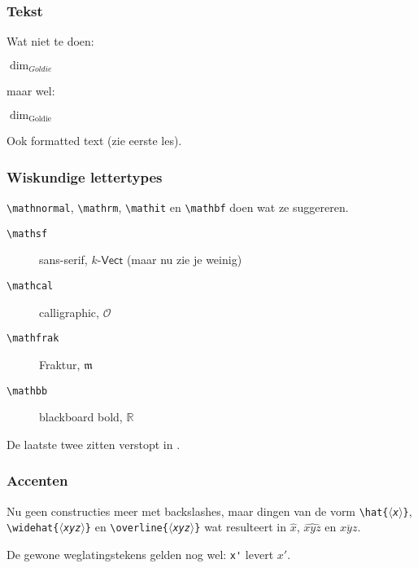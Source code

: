 \begin{frame}[fragile]
  \frametitle{Tekst}

  Wat niet te doen:
  \begin{LTXexample}
$\dim_{Goldie}$
  \end{LTXexample}
  maar wel:
  \begin{LTXexample}
$\dim_{\text{Goldie}}$
  \end{LTXexample}

  Ook formatted text (zie eerste les).
\end{frame}

\begin{frame}[fragile]
  \frametitle{Wiskundige lettertypes}

  \texttt{\textbackslash mathnormal}, \texttt{\textbackslash mathrm}, \texttt{\textbackslash mathit} en \texttt{\textbackslash mathbf} doen wat ze suggereren.

  \begin{description}
    \item[\texttt{\textbackslash mathsf}] sans-serif, $\text{$k$-}\mathsf{Vect}$ (maar nu zie je weinig)
    \item[\texttt{\textbackslash mathcal}] calligraphic, $\mathcal{O}$
    \item[\texttt{\textbackslash mathfrak}] Fraktur, $\mathfrak{m}$
    \item[\texttt{\textbackslash mathbb}] blackboard bold, $\mathbb{R}$
  \end{description}

  De laatste twee zitten verstopt in .
\end{frame}

\begin{frame}[fragile]
  \frametitle{Accenten}

  Nu geen constructies meer met backslashes, maar dingen van de vorm \texttt{\textbackslash hat\{\textsl{$\langle$x$\rangle$}\}}, \texttt{\textbackslash widehat\{\textsl{$\langle$xyz$\rangle$}\}} en \texttt{\textbackslash overline\{\textsl{$\langle$xyz$\rangle$}\}} wat resulteert in $\hat{x}$, $\widehat{xyz}$ en $\overline{xyz}$.

  De gewone weglatingstekens gelden nog wel: \verb|x'| levert $x'$.
\end{frame}

